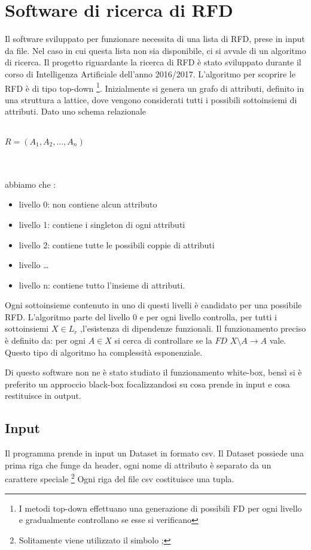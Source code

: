 \section{Software di ricerca di RFD}
Il software sviluppato per funzionare necessita di una lista di RFD, prese in input da file. Nel caso in cui questa lista non sia disponibile, ci si avvale di un algoritmo di ricerca.
Il progetto riguardante la ricerca di RFD è stato sviluppato durante il corso di Intelligenza Artificiale dell’anno 2016/2017.
L’algoritmo per scoprire le RFD è di tipo top-down \footnote{I metodi top-down effettuano una generazione di possibili FD per ogni livello e gradualmente controllano se esse si verificano}.
Inizialmente si genera un grafo di attributi, definito in una struttura a lattice, dove vengono considerati tutti i possibili sottoinsiemi di attributi. Dato uno schema relazionale
\\~\\ \centerline{$R=(A_1,A_2,...,A_n)$} \\~\\abbiamo che :
\begin{itemize}[noitemsep]
\item livello 0: non contiene alcun attributo
\item livello 1: contiene i singleton di ogni attributi
\item livello 2: contiene tutte le possibili coppie di attributi
\item livello \ldots
\item livello n: contiene tutto l’insieme di attributi.
\end{itemize}
Ogni sottoinsieme contenuto in uno di questi livelli è candidato per una possibile RFD.
L’algoritmo parte del livello 0  e per ogni livello controlla, per tutti i sottoinsiemi $X \in L_r$ ,l’esistenza di dipendenze funzionali.
Il funzionamento preciso è definito da:
per ogni $A \in X$ si cerca di controllare se la $FD$  $X\setminus A \xrightarrow{}  A $ vale. Questo tipo di algoritmo ha complessità esponenziale.

Di questo software non ne è stato studiato il funzionamento white-box, bensì si è preferito un approccio black-box focalizzandosi su cosa prende in input e cosa restituisce in output.

\subsection{Input}
Il programma prende in input un Dataset in formato csv.
Il Dataset possiede una prima riga che funge da header, ogni nome di attributo è separato da un carattere speciale \footnote{Solitamente viene utilizzato il simbolo  ;  }
Ogni riga del file csv costituisce una tupla.

